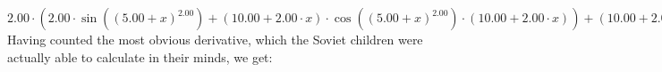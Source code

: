 \documentclass{article}
\begin{document}
 ${{{2.00} \cdot \left({{{2.00} \cdot  \sin {\left({\left({{5.00} + {x}}\right) ^ {2.00}}\right)} } + {\left({{10.00} + {{2.00} \cdot {x}}}\right) \cdot { \cos {\left({\left({{5.00} + {x}}\right) ^ {2.00}}\right)}  \cdot \left({{10.00} + {{2.00} \cdot {x}}}\right)}}}\right)} + {\left({{10.00} + {{2.00} \cdot {x}}}\right) \cdot \left({{{2.00} \cdot { \cos {\left({\left({{5.00} + {x}}\right) ^ {2.00}}\right)}  \cdot \left({{10.00} + {{2.00} \cdot {x}}}\right)}} + {{{2.00} \cdot { \cos {\left({\left({{5.00} + {x}}\right) ^ {2.00}}\right)}  \cdot \left({{10.00} + {{2.00} \cdot {x}}}\right)}} + {\left({{10.00} + {{2.00} \cdot {x}}}\right) \cdot \left({{\left({-1.00}\right) \cdot {\left({{10.00} + {{2.00} \cdot {x}}}\right) \cdot {\left({{10.00} + {{2.00} \cdot {x}}}\right) \cdot  \sin {\left({\left({{5.00} + {x}}\right) ^ {2.00}}\right)} }}} + {{2.00} \cdot  \cos {\left({\left({{5.00} + {x}}\right) ^ {2.00}}\right)} }}\right)}}}\right)}} = {{{{4.00} \cdot  \sin {\left({\left({{5.00} + {x}}\right) ^ {2.00}}\right)} } + {{2.00} \cdot {\left({{10.00} + {{2.00} \cdot {x}}}\right) \cdot { \cos {\left({\left({{5.00} + {x}}\right) ^ {2.00}}\right)}  \cdot \left({{10.00} + {{2.00} \cdot {x}}}\right)}}}} + {\left({{10.00} + {{2.00} \cdot {x}}}\right) \cdot \left({{{2.00} \cdot { \cos {\left({\left({{5.00} + {x}}\right) ^ {2.00}}\right)}  \cdot \left({{10.00} + {{2.00} \cdot {x}}}\right)}} + {{{2.00} \cdot { \cos {\left({\left({{5.00} + {x}}\right) ^ {2.00}}\right)}  \cdot \left({{10.00} + {{2.00} \cdot {x}}}\right)}} + {\left({{10.00} + {{2.00} \cdot {x}}}\right) \cdot \left({{\left({-1.00}\right) \cdot {\left({{10.00} + {{2.00} \cdot {x}}}\right) \cdot {\left({{10.00} + {{2.00} \cdot {x}}}\right) \cdot  \sin {\left({\left({{5.00} + {x}}\right) ^ {2.00}}\right)} }}} + {{2.00} \cdot  \cos {\left({\left({{5.00} + {x}}\right) ^ {2.00}}\right)} }}\right)}}}\right)}}$ 
 \newline
 \newline 
Having counted the most obvious derivative, which the Soviet children were actually able to calculate in their minds, we get:
\end{document}
